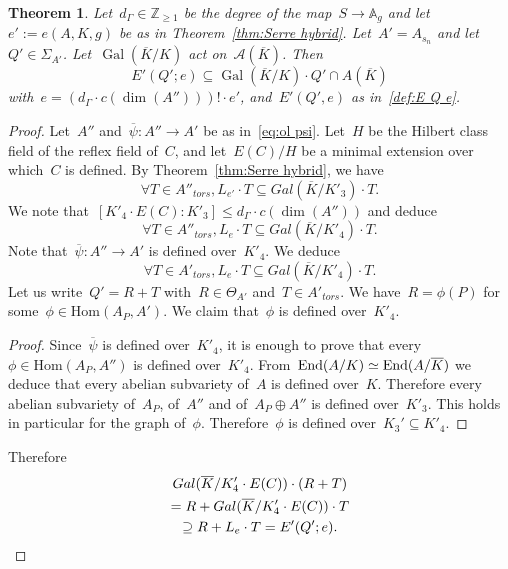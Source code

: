 \documentclass[12pt]{amsart}
\newtheorem{theorem}{Theorem}[section]
\newcommand{\Hom}{\mbox{Hom}}
\newcommand{\End}{{\rm End}}
\newcommand{\Gal}{{\rm Gal}}
\newcommand{\Z}{{\mathbb Z}}
\renewcommand{\Gal}{{\operatorname{Gal}}}
\newcommand{\ol}{\overline}
\begin{document}
\begin{theorem}\label{thm:Gal E'n} Let~$d_\Gamma\in\Z_{\geq1}$ be the degree of the map~$S\to \mathbb{A}_g$ and let~$e':=e(A,K,g)$ be as in Theorem~\ref{thm:Serre hybrid}.
Let~$A'=A_{s_n}$ and let~$Q'\in\Sigma_{A'}$. Let~$\Gal(\ol{K}/K)$ act on~$\mathcal{A}(\ol{K})$.
Then
\[
E'(Q';e)\subseteq \Gal(\ol{K}/K) \cdot Q'\cap A(\ol{K})
\]
with~$e=(d_\Gamma\cdot  c(\dim(A'')))!\cdot e'$, and~$E'(Q',e)$ as in~\eqref{def:E Q e}.
\end{theorem}
\begin{proof}Let~$A''$ and~$\ol{\psi}:A''\to A'$ be as in~\eqref{eq:ol psi}. Let~$H$ be the Hilbert class field of the reflex field of~$C$, and let~$E(C)/H$ be a minimal extension over which~$C$ is defined. 
By Theorem~\ref{thm:Serre hybrid}, we have
\[
\forall T\in A''_{tors},
L_{e'}\cdot T\subseteq Gal(\ol{K}/K'_3)\cdot T.
\]
We note that~$[K'_4\cdot E(C):K'_3]\leq d_\Gamma \cdot c(\dim(A''))$ and deduce
\[
\forall T\in A''_{tors},
L_{e}\cdot T\subseteq Gal(\ol{K}/K'_4)\cdot T.
\]
Note that~$\ol{\psi}:A''\to A'$ is defined over~$K'_4$. We deduce
\[
\forall T\in A'_{tors},
L_{e}\cdot T\subseteq Gal(\ol{K}/K'_4)\cdot T.
\]
Let us write~$Q'=R+T$ with~$R\in \Theta_{A'}$ and~$T\in A'_{tors}$. 
We have~$R=\phi(P)$ for some~$\phi\in \Hom(A_P,A')$. We claim that~$\phi$
is defined over~$K'_4$.
\begin{proof}Since~$\ol{\psi}$ is defined over~$K'_4$, it is enough to prove that every~$\phi\in \Hom(A_P,A'')$ is defined over~$K'_4$. From~$\End(A/K)\simeq \End(A/\ol{K})$ we deduce that every abelian subvariety of~$A$ is defined over~$K$. Therefore every abelian subvariety of~$A_P$, of~$A''$ and of~$A_P\oplus A''$ is defined over~$K'_3$. This holds in particular for the graph of~$\phi$. Therefore~$\phi$ is defined over~$K_3'\subseteq K'_4$.
\end{proof}
Therefore
\begin{multline}
Gal(\ol{K}/K'_4\cdot E(C))\cdot (R+T)\\
=R+Gal(\ol{K}/K_4'\cdot E(C))\cdot T\\
\supseteq
R+L_e\cdot T=E'(Q';e).\qedhere
\end{multline}
\end{proof}
\end{document}
